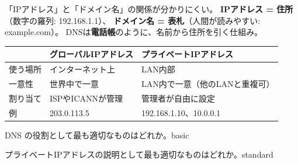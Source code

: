 



\mondaipage
{}

\begin{stumble}
「IPアドレス」と「ドメイン名」の関係が分かりにくい。
\textbf{IPアドレス = 住所}（数字の羅列: 192.168.1.1）、
\textbf{ドメイン名 = 表札}（人間が読みやすい: example.com）。
DNSは\textbf{電話帳}のように、名前から住所を引く仕組み。
\end{stumble}

\begin{comparison}
\begin{tabularx}{\textwidth}{lXX}
  \toprule
  & \textbf{グローバルIPアドレス} & \textbf{プライベートIPアドレス} \\
  \midrule
  使う場所 & インターネット上 & LAN内部 \\
  一意性 & 世界中で一意 & LAN内で一意（他のLANと重複可） \\
  割り当て & ISPやICANNが管理 & 管理者が自由に設定 \\
  例 & 203.0.113.5 & 192.168.1.10、10.0.0.1 \\
  \bottomrule
\end{tabularx}
\end{comparison}


\begin{mondai}{DNS の役割として最も適切なものはどれか。}{basic}
\end{mondai}

\begin{mondai}{プライベートIPアドレスの説明として最も適切なものはどれか。}{standard}
\end{mondai}

